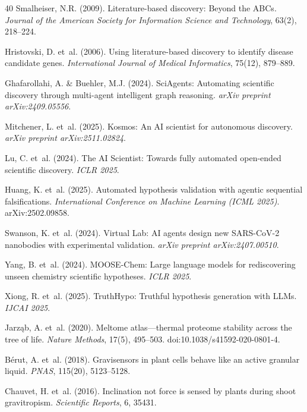 \documentclass[11pt]{article}
\begin{document}
\begin{thebibliography}{40}
Smalheiser, N.R. (2009).
Literature-based discovery: Beyond the ABCs.
\emph{Journal of the American Society for Information Science and Technology}, 63(2), 218--224.

Hristovski, D. et~al. (2006).
Using literature-based discovery to identify disease candidate genes.
\emph{International Journal of Medical Informatics}, 75(12), 879--889.

Ghafarollahi, A. \& Buehler, M.J. (2024).
SciAgents: Automating scientific discovery through multi-agent intelligent graph reasoning.
\emph{arXiv preprint arXiv:2409.05556}.

Mitchener, L. et~al. (2025).
Kosmos: An AI scientist for autonomous discovery.
\emph{arXiv preprint arXiv:2511.02824}.

Lu, C. et~al. (2024).
The AI Scientist: Towards fully automated open-ended scientific discovery.
\emph{ICLR 2025}.

Huang, K. et~al. (2025).
Automated hypothesis validation with agentic sequential falsifications.
\emph{International Conference on Machine Learning (ICML 2025)}.
arXiv:2502.09858.

Swanson, K. et~al. (2024).
Virtual Lab: AI agents design new SARS-CoV-2 nanobodies with experimental validation.
\emph{arXiv preprint arXiv:2407.00510}.

Yang, B. et~al. (2024).
MOOSE-Chem: Large language models for rediscovering unseen chemistry scientific hypotheses.
\emph{ICLR 2025}.

Xiong, R. et~al. (2025).
TruthHypo: Truthful hypothesis generation with LLMs.
\emph{IJCAI 2025}.

Jarz\k{a}b, A. et~al. (2020).
Meltome atlas---thermal proteome stability across the tree of life.
\emph{Nature Methods}, 17(5), 495--503.
doi:10.1038/s41592-020-0801-4.

B\'{e}rut, A. et~al. (2018).
Gravisensors in plant cells behave like an active granular liquid.
\emph{PNAS}, 115(20), 5123--5128.

Chauvet, H. et~al. (2016).
Inclination not force is sensed by plants during shoot gravitropism.
\emph{Scientific Reports}, 6, 35431.


\end{thebibliography}
\end{document}

